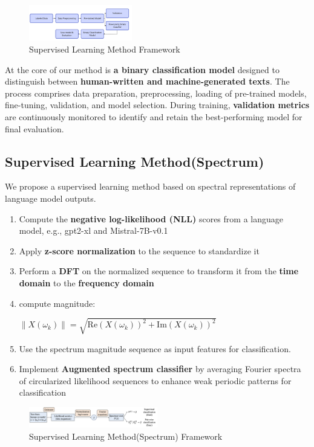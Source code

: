 \documentclass[lettersize,journal]{IEEEtran}
\begin{document}
\begin{figure}[h!]
    \centering
   \includegraphics[width=0.4\textwidth]{images/sup method.jpg}
   \caption{Supervised Learning Method Framework}
\end{figure}


At the core of our method is {\bf a binary classification model} designed to distinguish between \textbf{human-written and machine-generated texts}. The process comprises data preparation, preprocessing, loading of pre-trained models, fine-tuning, validation, and model selection. During training, \textbf{validation metrics} are continuously monitored to identify and retain the best-performing model for final evaluation.

\subsection{Supervised Learning Method(Spectrum)}

We propose a supervised learning method based on spectral representations of language model outputs.


\begin{enumerate}
  \item Compute the \textbf{negative log-likelihood (NLL)} scores from a language model, e.g., gpt2-xl and Mistral-7B-v0.1
  \item Apply \textbf{z-score normalization} to the sequence to standardize it
  \item Perform a \textbf{DFT} on the normalized sequence to transform it from the \textbf{time domain} to the \textbf{frequency domain}
  \item compute magnitude:
  
  $\|X(\omega_k)\| = \sqrt{\text{Re}(X(\omega_k))^2 + \text{Im}(X(\omega_k))^2}$
  \item Use the spectrum magnitude sequence as input features for classification.
  \item Implement \textbf{Augmented spectrum classifier} by averaging Fourier spectra of circularized likelihood sequences to enhance weak periodic patterns for classification
\end{enumerate}

  \begin{figure}[h!]
    \centering
   \includegraphics[width=0.5\textwidth]{images/procedure.png}
   \caption{Supervised Learning Method(Spectrum) Framework}
\end{figure}  
\end{document}
